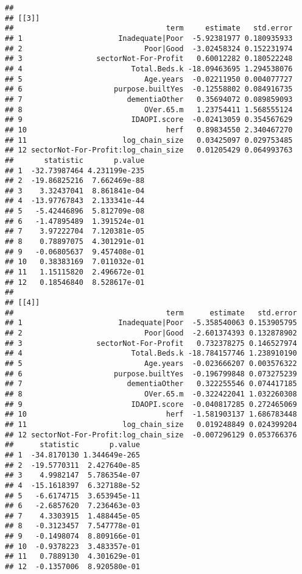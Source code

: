 \documentclass[]{article}
\begin{document}
\begin{verbatim}
## 
## [[3]]
##                                   term     estimate   std.error
## 1                      Inadequate|Poor  -5.92381977 0.180935933
## 2                            Poor|Good  -3.02458324 0.152231974
## 3                 sectorNot-For-Profit   0.60012282 0.180522248
## 4                         Total.Beds.k -18.09463695 1.294538076
## 5                            Age.years  -0.02211950 0.004077727
## 6                     purpose.builtYes  -0.12558802 0.084916735
## 7                        dementiaOther   0.35694072 0.089859093
## 8                            OVer.65.m   1.23754411 1.568555124
## 9                         IDAOPI.score  -0.02413059 0.354567629
## 10                                herf   0.89834550 2.340467270
## 11                      log_chain_size   0.03425097 0.029753485
## 12 sectorNot-For-Profit:log_chain_size   0.01205429 0.064993763
##       statistic       p.value
## 1  -32.73987464 4.231199e-235
## 2  -19.86825216  7.662469e-88
## 3    3.32437041  8.861841e-04
## 4  -13.97767843  2.133341e-44
## 5   -5.42446896  5.812709e-08
## 6   -1.47895489  1.391524e-01
## 7    3.97222704  7.120381e-05
## 8    0.78897075  4.301291e-01
## 9   -0.06805637  9.457408e-01
## 10   0.38383169  7.011032e-01
## 11   1.15115820  2.496672e-01
## 12   0.18546840  8.528617e-01
## 
## [[4]]
##                                   term      estimate   std.error
## 1                      Inadequate|Poor  -5.358540063 0.153905795
## 2                            Poor|Good  -2.601374393 0.132878902
## 3                 sectorNot-For-Profit   0.732378275 0.146527974
## 4                         Total.Beds.k -18.784157746 1.238910190
## 5                            Age.years  -0.023666207 0.003576322
## 6                     purpose.builtYes  -0.196799848 0.073275239
## 7                        dementiaOther   0.322255546 0.074417185
## 8                            OVer.65.m  -0.322422041 1.032260308
## 9                         IDAOPI.score  -0.040817285 0.272465069
## 10                                herf  -1.581903137 1.686783448
## 11                      log_chain_size   0.019248849 0.024399204
## 12 sectorNot-For-Profit:log_chain_size  -0.007296129 0.053766376
##      statistic       p.value
## 1  -34.8170130 1.344649e-265
## 2  -19.5770311  2.427640e-85
## 3    4.9982147  5.786354e-07
## 4  -15.1618397  6.327188e-52
## 5   -6.6174715  3.653945e-11
## 6   -2.6857620  7.236463e-03
## 7    4.3303915  1.488445e-05
## 8   -0.3123457  7.547778e-01
## 9   -0.1498074  8.809166e-01
## 10  -0.9378223  3.483357e-01
## 11   0.7889130  4.301629e-01
## 12  -0.1357006  8.920580e-01

\end{verbatim}
\end{document}
